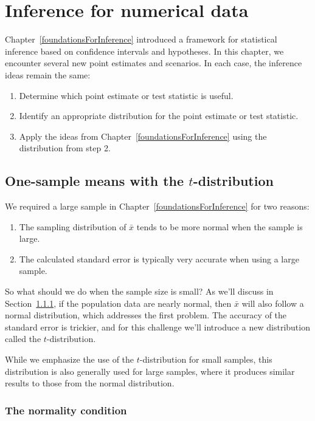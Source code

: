 \chapter{Inference for numerical data}
\label{inferenceForNumericalData}

Chapter~\ref{foundationsForInference} introduced a framework for statistical inference based on confidence intervals and hypotheses. In this chapter, we encounter several new point estimates and scenarios. In each case, the inference ideas remain the same:
\begin{enumerate}
\setlength{\itemsep}{0mm}
\item Determine which point estimate or test statistic is useful.
\item Identify an appropriate distribution for the point estimate or test statistic.
\item Apply the ideas from Chapter~\ref{foundationsForInference} using the distribution from step 2.
\end{enumerate}



\section{One-sample means with the $t$-distribution}
\label{oneSampleMeansWithTDistribution}

We required a large sample in Chapter~\ref{foundationsForInference} for two reasons:
\begin{enumerate}
\setlength{\itemsep}{0mm}
\item The sampling distribution of $\bar{x}$ tends to be more normal when the sample is large.
\item The calculated standard error is typically very accurate when using a large sample.
\end{enumerate}
So what should we do when the sample size is small? As we'll discuss in Section~\ref{normalityCond}, if the population data are nearly normal, then $\bar{x}$ will also follow a normal distribution, which addresses the first problem. The accuracy of the standard error is trickier, and for this challenge we'll introduce a new distribution called the $t$-distribution.

While we emphasize the use of the $t$-distribution for small samples, this distribution is also generally used for large samples, where it produces similar results to those from the normal distribution.


\subsection{The normality condition}
\label{normalityCond}

